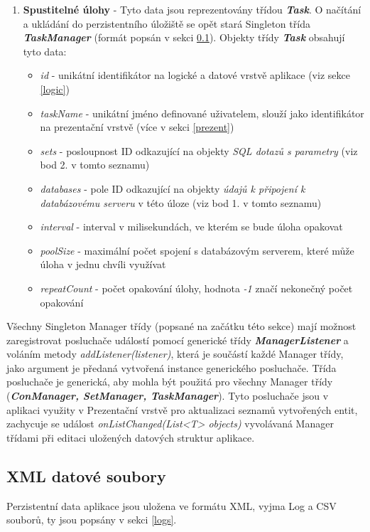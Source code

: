 \documentclass[czech,bachelor,public,dept460,male,cpdeclaration,twoside]{diploma}
\begin{document}
\begin{enumerate}
  \item \textbf{Spustitelné úlohy} - Tyto data jsou reprezentovány třídou \textbf{\emph{Task}}. O načítání a ukládání do perzistentního úložiště se opět stará Singleton třída \textbf{\emph{TaskManager}} (formát popsán v sekci \ref{xml}). Objekty třídy \textbf{\emph{Task}} obsahují tyto data:
    \begin{itemize}
  	\item \textit{id} - unikátní identifikátor na logické a datové vrstvě aplikace (viz sekce \ref{logic})
  	\item \textit{taskName} - unikátní jméno definované uživatelem, slouží jako identifikátor  na prezentační vrstvě (více v sekci \ref{prezent})
  	\item \textit{sets} - posloupnost ID odkazující na objekty \textit{SQL dotazů s parametry} (viz bod 2. v tomto seznamu)
  	\item \textit{databases} - pole ID odkazující na objekty \textit{údajů k připojení k databázovému serveru} v této úloze (viz bod 1. v tomto seznamu)
  	\item \textit{interval} - interval v milisekundách, ve kterém se bude úloha opakovat
  	\item \textit{poolSize} - maximální počet spojení s databázovým serverem, které může úloha v jednu chvíli využívat
  	\item \textit{repeatCount} - počet opakování úlohy, hodnota \textit{-1} značí nekonečný počet opakování
    \end{itemize}
\end{enumerate}

Všechny Singleton Manager třídy (popsané na začátku této sekce) mají možnost zaregistrovat posluchače událostí pomocí generické třídy \textbf{\emph{ManagerListener}} a voláním metody \newline \textit{addListener(listener)}, která je součástí každé Manager třídy, jako argument je předaná vytvořená instance generického posluchače. Třída posluchače je generická, aby mohla být použitá pro všechny Manager třídy (\textbf\emph{{ConManager, SetManager, TaskManager}}). Tyto posluchače jsou v aplikaci využity v Prezentační vrstvě pro aktualizaci seznamů vytvořených entit, zachycuje se událost \textit{onListChanged(List<T> objects)} vyvolávaná Manager třídami při editaci uložených datových struktur aplikace.

\newpage
\subsection{XML datové soubory} \label{xml}
Perzistentní data aplikace jsou uložena ve formátu XML, vyjma Log a CSV souborů, ty jsou popsány v sekci \ref{logs}.\newline
\end{document}
